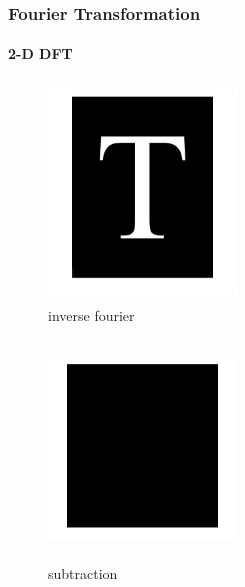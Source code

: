 \documentclass[11 pt,t]{beamer}
\begin{document}
\begin{frame}
\frametitle{Fourier Transformation}
\framesubtitle{2-D DFT}
\begin{minipage}[t]{0.4\linewidth}
\begin{figure}
   \includegraphics[width=5cm,height=5.8cm]{back}
\caption{inverse fourier}
 \end{figure}
        \end{minipage}
\begin{minipage}[t]{0.4\linewidth}
\begin{figure}
   \includegraphics[width=5cm,height=5.8cm]{sub}
\caption{subtraction}
 \end{figure}
        \end{minipage}
\end{frame}
\end{document}
